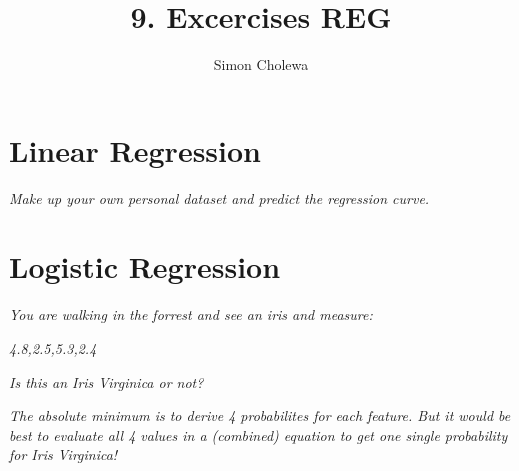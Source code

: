 \documentclass[11pt,a4paper]{article}
\author{Simon Cholewa}
\title{9. Excercises REG}
\begin{document}
\maketitle

\section{Linear Regression}

\textit{Make up your own personal dataset and predict the regression curve. }


\section{Logistic Regression}

\textit{You are walking in the forrest and see an iris and measure:}

\textit{4.8,2.5,5.3,2.4}

\textit{Is this an Iris Virginica or not?}

\textit{The absolute minimum is to derive 4 probabilites for each feature. But it would be best to evaluate all 4 values in a (combined) equation to get one single probability for Iris Virginica! }
\end{document}

